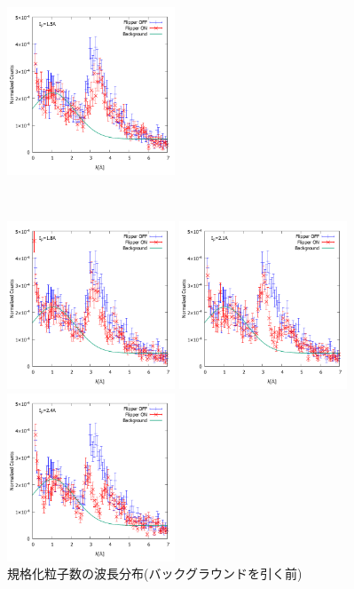 \begin{figure}[h]
\begin{minipage}{0.33\hsize}
\end{minipage}
\begin{minipage}{0.33\hsize}
\includegraphics[width=5cm]{discussion/NC/NormalizedCounts_15A.pdf}
\end{minipage}\\
\begin{minipage}{0.33\hsize}
\includegraphics[width=5cm]{discussion/NC/NormalizedCounts_18A.pdf}
\end{minipage}
\begin{minipage}{0.33\hsize}
\includegraphics[width=5cm]{discussion/NC/NormalizedCounts_21A.pdf}
\end{minipage}
\begin{minipage}{0.33\hsize}
\includegraphics[width=5cm]{discussion/NC/NormalizedCounts_24A.pdf}
\end{minipage}
\caption{規格化粒子数の波長分布(バックグラウンドを引く前)}\label{Discussion_fig_NC}
\end{figure}

